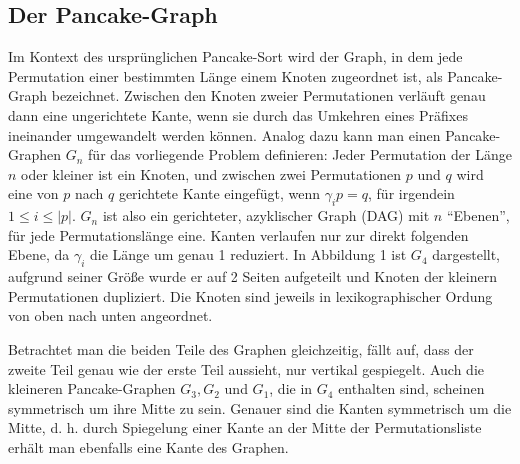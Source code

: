 \documentclass[a4paper, 11pt, ngerman]{article}
\begin{document}
\subsection{Der Pancake-Graph}

Im Kontext des ursprünglichen Pancake-Sort wird der Graph, in dem jede Permutation einer bestimmten Länge einem Knoten zugeordnet ist, als Pancake-Graph bezeichnet. Zwischen den Knoten zweier Permutationen verläuft genau dann eine ungerichtete Kante, wenn sie durch das Umkehren eines Präfixes ineinander umgewandelt werden können. Analog dazu kann man einen Pancake-Graphen $G_n$ für das vorliegende Problem definieren: Jeder Permutation der Länge $n$ oder kleiner ist ein Knoten, und zwischen zwei Permutationen $p$ und $q$ wird eine von $p$ nach $q$ gerichtete Kante eingefügt, wenn $\gamma_i p = q$, für irgendein $1 \le i \le |p|$. $G_n$ ist also ein gerichteter, azyklischer Graph (DAG) mit $n$ ``Ebenen'', für jede Permutationslänge eine. Kanten verlaufen nur zur direkt folgenden Ebene, da $\gamma_i$ die Länge um genau 1 reduziert. In Abbildung 1 ist $G_4$ dargestellt, aufgrund seiner Größe wurde er auf 2 Seiten aufgeteilt und Knoten der kleinern Permutationen dupliziert. Die Knoten sind jeweils in lexikographischer Ordung von oben nach unten angeordnet.

Betrachtet man die beiden Teile des Graphen gleichzeitig, fällt auf, dass der zweite Teil genau wie der erste Teil aussieht, nur vertikal gespiegelt. Auch die kleineren Pancake-Graphen $G_3, G_2$ und $G_1$, die in $G_4$ enthalten sind, scheinen symmetrisch um ihre Mitte zu sein. Genauer sind die Kanten symmetrisch um die Mitte, d. h. durch Spiegelung einer Kante an der Mitte der Permutationsliste erhält man ebenfalls eine Kante des Graphen.
\end{document}
